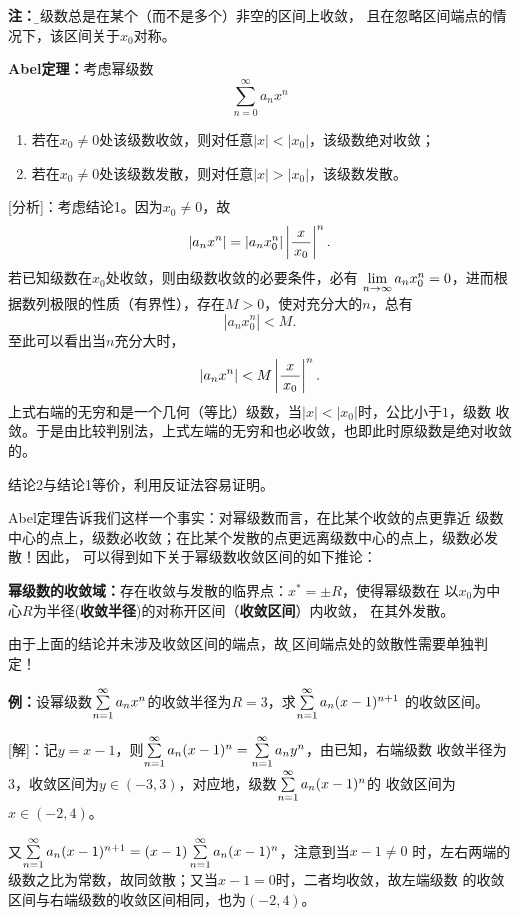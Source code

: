 {\bf 注：}{\b 幂级数总是在某个（而不是多个）非空的区间上收敛，
且在忽略区间端点的情况下，该区间关于$x_0$对称。}

\begin{thx}
	{\bf Abel定理：}考虑幂级数
	$$\sum\limits_{n=0}^{\infty}a_nx^n$$
	\begin{enumerate}%
	  \item 若在$x_0\ne 0$处该级数收敛，则对任意$|x|<|x_0|$，该级数绝对收敛； 
	  \item 若在$x_0\ne 0$处该级数发散，则对任意$|x|>|x_0|$，该级数发散。 
	\end{enumerate}
\end{thx}

[分析]：考虑结论1。因为$x_0\ne 0$，故
$$|a_nx^n|=\left|a_nx_0^n\right|\left|\displaystyle\frac{\,{x}\,}{\,{x_0}\,}\right|^n.$$
若已知级数在$x_0$处收敛，则由级数收敛的必要条件，必有
$\lim\limits_{n\to\infty} a_nx_0^n=0$，进而根据数列极限的性质（有界性），存在$M>0$，使对充分大的$n$，总有
$$\left|a_nx_0^n\right|<M.$$
至此可以看出当$n$充分大时，
$$|a_nx^n|<M\left|\displaystyle\frac{\,{x}\,}{\,{x_0}\,}\right|^n.$$
上式右端的无穷和是一个几何（等比）级数，当$|x|<|x_0|$时，公比小于$1$，级数
收敛。于是由比较判别法，上式左端的无穷和也必收敛，也即此时原级数是绝对收敛的。

结论2与结论1等价，利用反证法容易证明。

Abel定理告诉我们这样一个事实：{\kaishu 对幂级数而言，在比某个收敛的点更靠近
级数中心的点上，级数必收敛；在比某个发散的点更远离级数中心的点上，级数必发散！}因此，
可以得到如下关于幂级数收敛区间的如下推论：

\begin{thx}
	{\bf 幂级数的收敛域：}存在收敛与发散的临界点：$x^*=\pm R$，使得幂级数在
	以$x_0$为中心$R$为半径({\bf 收敛半径})的对称开区间（{\bf 收敛区间}）内收敛，
	在其外发散。	
\end{thx}

由于上面的结论并未涉及收敛区间的端点，故{\b 在区间端点处的敛散性需要单独判定！}

{\bf 例：}设幂级数$\sum\limits_{n=1}^{\infty} a_nx^n$的收敛半径为$R=3$，求$\sum\limits_{n=1}^{\infty} a_n(x-1)^{n+1}$
的收敛区间。

[解]：记$y=x-1$，则$\sum\limits_{n=1}^{\infty} a_n(x-1)^n=\sum\limits_{n=1}^{\infty} a_ny^n$，由已知，右端级数
收敛半径为$3$，收敛区间为$y\in(-3,3)$，对应地，级数$\sum\limits_{n=1}^{\infty} a_n(x-1)^n$的
收敛区间为$x\in(-2,4)$。

又$\sum\limits_{n=1}^{\infty} a_n(x-1)^{n+1}=(x-1)\sum\limits_{n=1}^{\infty} a_n(x-1)^n$，注意到当$x-1\ne 0$
时，左右两端的级数之比为常数，故同敛散；又当$x-1=0$时，二者均收敛，故左端级数
的收敛区间与右端级数的收敛区间相同，也为$(-2,4)$。\fin

